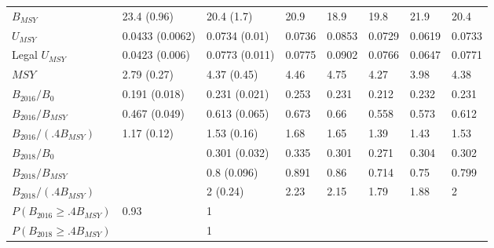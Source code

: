 \documentclass[11pt]{book}
\begin{document}
\begin{landscape}
\begin{longtable}[t]{llllllll}
$B_{MSY}$ & 23.4 (0.96) & 20.4 (1.7) & 20.9 & 18.9 & 19.8 & 21.9 & 20.4\\
$U_{MSY}$ & 0.0433 (0.0062) & 0.0734 (0.01) & 0.0736 & 0.0853 & 0.0729 & 0.0619 & 0.0733\\
Legal $U_{MSY}$ & 0.0423 (0.006) & 0.0773 (0.011) & 0.0775 & 0.0902 & 0.0766 & 0.0647 & 0.0771\\
$MSY$ & 2.79 (0.27) & 4.37 (0.45) & 4.46 & 4.75 & 4.27 & 3.98 & 4.38\\
$B_{2016}/B_0$ & 0.191 (0.018) & 0.231 (0.021) & 0.253 & 0.231 & 0.212 & 0.232 & 0.231\\
$B_{2016}/B_{MSY}$ & 0.467 (0.049) & 0.613 (0.065) & 0.673 & 0.66 & 0.558 & 0.573 & 0.612\\
$B_{2016}/(.4B_{MSY})$ & 1.17 (0.12) & 1.53 (0.16) & 1.68 & 1.65 & 1.39 & 1.43 & 1.53\\
$B_{2018}/B_0$ &  & 0.301 (0.032) & 0.335 & 0.301 & 0.271 & 0.304 & 0.302\\
$B_{2018}/B_{MSY}$ &  & 0.8 (0.096) & 0.891 & 0.86 & 0.714 & 0.75 & 0.799\\
$B_{2018}/(.4B_{MSY})$ &  & 2 (0.24) & 2.23 & 2.15 & 1.79 & 1.88 & 2\\
$P(B_{2016} \geq .4B_{MSY})$ & 0.93 & 1 &  &  &  &  & \\
$P(B_{2018} \geq .4B_{MSY})$ &  & 1 &  &  &  &  & \\*
\end{longtable}
\end{landscape}
\endgroup{}

\newpage
\end{document}
